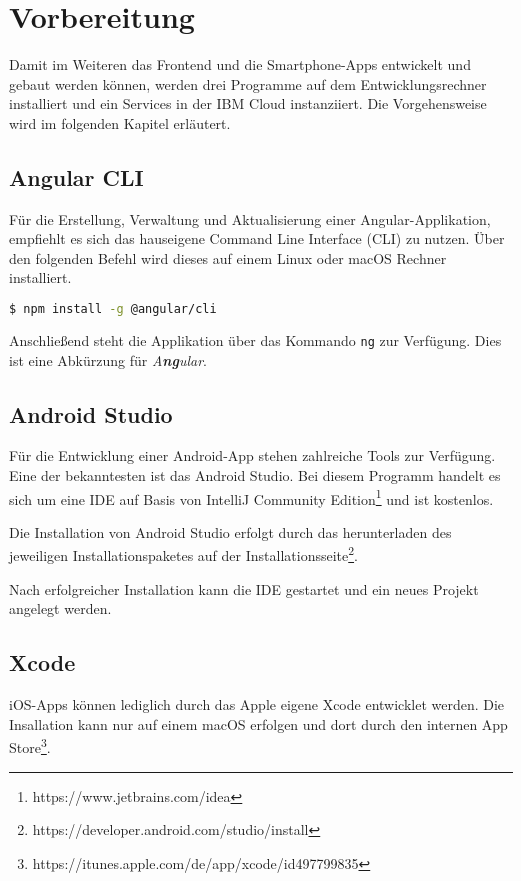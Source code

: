 \section{Vorbereitung}
Damit im Weiteren das Frontend und die Smartphone-Apps entwickelt und gebaut werden können, werden drei Programme auf
dem Entwicklungsrechner installiert und ein Services in der IBM Cloud instanziiert. Die Vorgehensweise wird im
folgenden Kapitel erläutert.

\subsection{Angular CLI}
Für die Erstellung, Verwaltung und Aktualisierung einer Angular-Applikation, empfiehlt es sich das hauseigene Command
Line Interface (CLI) zu nutzen. Über den folgenden Befehl wird dieses auf einem Linux oder macOS Rechner installiert.

\begin{lstlisting}[language=bash, caption=Installation des Angular CLI, label=ls:vorbereitung_angularcli]
    $ npm install -g @angular/cli
\end{lstlisting}

Anschließend steht die Applikation über das Kommando \texttt{ng} zur Verfügung. Dies ist eine Abkürzung für
\textit{A\textbf{ng}ular}.

\subsection{Android Studio}
Für die Entwicklung einer Android-App stehen zahlreiche Tools zur Verfügung. Eine der bekanntesten ist das Android
Studio. Bei diesem Programm handelt es sich um eine IDE auf Basis von IntelliJ Community
Edition\footnote{https://www.jetbrains.com/idea} und ist kostenlos.

Die Installation von Android Studio erfolgt durch das herunterladen des jeweiligen Installationspaketes auf der
Installationsseite\footnote{https://developer.android.com/studio/install}.

Nach erfolgreicher Installation kann die IDE gestartet und ein neues Projekt angelegt werden.

\subsection{Xcode}
iOS-Apps können lediglich durch das Apple eigene Xcode entwicklet werden. Die Insallation kann nur auf einem macOS
erfolgen und dort durch den internen App Store\footnote{https://itunes.apple.com/de/app/xcode/id497799835}.


